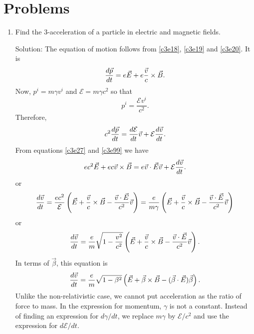 \section{Problems}
\begin{enumerate}
\item Find the 3-acceleration of a particle in electric and magnetic fields.
\item[Solution:] The equation of motion follows from \eqref{c3e18}, \eqref{c3e19}
and \eqref{c3e20}. It is
\begin{equation}\label{c3e100}
\frac{d{\vec{p}}}{d{t}} = e\vec{E} + e\frac{\vec{v}}{c}\times\vec{B}.
\end{equation}
Now, $p^i = m\gamma v^i$ and $\mathcal{E} = m\gamma c^2$ so that 
\[
p^i = \frac{\mathcal{E} v^i}{c^2}.
\]
Therefore,
\[
c^2\frac{d{\vec{p}}}{d{t}} = \frac{d{\mathcal{E}}}{d{t}}\vec{v} + \mathcal{E}\frac{d{\vec{v}}}{d{t}}.
\]
From equations \eqref{c3e27} and \eqref{c3e99} we have
\[
ec^2\vec{E} + ec\vec{v}\times\vec{B} = e\vec{v}\cdot\vec{E}\vec{v} + \mathcal{E}\frac{d{\vec{v}}}{d{t}}.
\]
or
\[
\frac{d{\vec{v}}}{d{t}} = \frac{ec^2}{\mathcal{E}}
\left(\vec{E} + \frac{\vec{v}}{c}\times\vec{B} - \frac{\vec{v}\cdot\vec{E}}{c^2}\vec{v}\right)
= \frac{e}{m\gamma}
\left(\vec{E} + \frac{\vec{v}}{c}\times\vec{B} - \frac{\vec{v}\cdot\vec{E}}{c^2}\vec{v}\right)
\]
or
\begin{equation}\label{c3e101}
\frac{d{\vec{v}}}{d{t}} = \frac{e}{m}\sqrt{1 - \frac{v^2}{c^2}}
\left(\vec{E} + \frac{\vec{v}}{c}\times\vec{B} - \frac{\vec{v}\cdot\vec{E}}{c^2}\vec{v}\right).
\end{equation}
In terms of $\vec{\beta}$, this equation is
\begin{equation}\label{c3e102}
\frac{d{\vec{v}}}{d{t}} = \frac{e}{m}\sqrt{1 - \beta^2}
\left(\vec{E} + \vec{\beta}\times\vec{B} - (\vec{\beta}\cdot\vec{E})\vec{\beta}\right).
\end{equation}
Unlike the non-relativistic case, we cannot put acceleration as the ratio of 
force to mass. In the expression for momentum, $\gamma$ is not a constant. Instead of
finding an expression for $d\gamma/dt$, we replace $m\gamma$ by $\mathcal{E}/c^2$
and use the expression for $d\mathcal{E}/dt$.


\end{enumerate}
